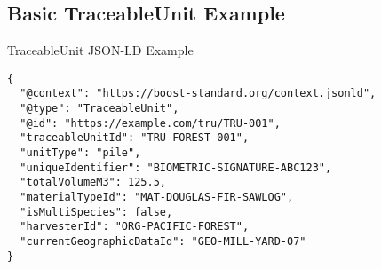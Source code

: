 
\subsection{Basic TraceableUnit Example}
\label{sec:basic-tru-example}

\begin{jsonexample}{TraceableUnit JSON-LD Example}
\begin{verbatim}
{
  "@context": "https://boost-standard.org/context.jsonld",
  "@type": "TraceableUnit", 
  "@id": "https://example.com/tru/TRU-001",
  "traceableUnitId": "TRU-FOREST-001",
  "unitType": "pile",
  "uniqueIdentifier": "BIOMETRIC-SIGNATURE-ABC123",
  "totalVolumeM3": 125.5,
  "materialTypeId": "MAT-DOUGLAS-FIR-SAWLOG", 
  "isMultiSpecies": false,
  "harvesterId": "ORG-PACIFIC-FOREST",
  "currentGeographicDataId": "GEO-MILL-YARD-07"
}
\end{verbatim}
\end{jsonexample}
